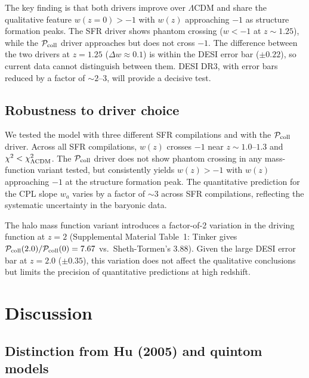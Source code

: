 \documentclass[aps,prd,twocolumn,superscriptaddress]{revtex4-2}
\begin{document}
The key finding is that both drivers improve over $\Lambda$CDM and share the qualitative feature $w(z=0) > -1$ with $w(z)$ approaching $-1$ as structure formation peaks. The SFR driver shows phantom crossing ($w < -1$ at $z \sim 1.25$), while the $\mathcal{P}_{\rm coll}$ driver approaches but does not cross $-1$. The difference between the two drivers at $z=1.25$ ($\Delta w \approx 0.1$) is within the DESI error bar ($\pm 0.22$), so current data cannot distinguish between them. DESI DR3, with error bars reduced by a factor of $\sim 2$--$3$, will provide a decisive test.

\subsection{Robustness to driver choice}

We tested the model with three different SFR compilations \cite{Madau:2014,Behroozi:2019,Driver:2018} and with the $\mathcal{P}_{\rm coll}$ driver. Across all SFR compilations, $w(z)$ crosses $-1$ near $z \sim 1.0$--$1.3$ and $\chi^2 < \chi^2_{\Lambda{\rm CDM}}$. The $\mathcal{P}_{\rm coll}$ driver does not show phantom crossing in any mass-function variant tested, but consistently yields $w(z) > -1$ with $w(z)$ approaching $-1$ at the structure formation peak. The quantitative prediction for the CPL slope $w_a$ varies by a factor of $\sim 3$ across SFR compilations, reflecting the systematic uncertainty in the baryonic data.

The halo mass function variant introduces a factor-of-2 variation in the driving function at $z=2$ (Supplemental Material Table~1: Tinker gives $\mathcal{P}_{\rm coll}(2.0)/\mathcal{P}_{\rm coll}(0) = 7.67$ vs.\ Sheth-Tormen's $3.88$). Given the large DESI error bar at $z=2.0$ ($\pm 0.35$), this variation does not affect the qualitative conclusions but limits the precision of quantitative predictions at high redshift.

\section{Discussion}
\label{sec:discussion}

\subsection{Distinction from Hu (2005) and quintom models}
\end{document}
